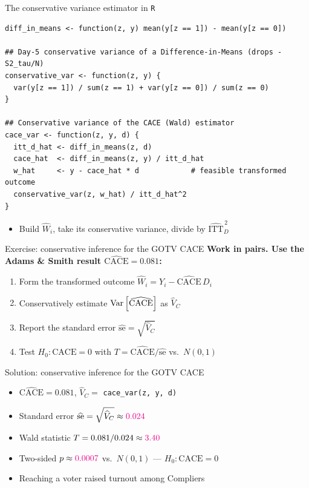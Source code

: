 \documentclass[table, xcolor = {dvipsnames}, 9pt]{beamer}
\theoremstyle{plain}
\newcommand{\mh}[1]{{\color{magenta}{#1}}}
\DeclareMathOperator{\Var}{\rm{Var}}
\newcommand{\CACE}{\mathrm{CACE}}
\newcommand{\hITTD}{\widehat{\mathrm{ITT}}_D}
\begin{document}
\begin{frame}[fragile]{The conservative variance estimator in \texttt{R}}
\begin{lstlisting}[style=Rstyle, basicstyle=\ttfamily\scriptsize, frame=single]
diff_in_means <- function(z, y) mean(y[z == 1]) - mean(y[z == 0])

## Day-5 conservative variance of a Difference-in-Means (drops -S2_tau/N)
conservative_var <- function(z, y) {
  var(y[z == 1]) / sum(z == 1) + var(y[z == 0]) / sum(z == 0)
}

## Conservative variance of the CACE (Wald) estimator
cace_var <- function(z, y, d) {
  itt_d_hat <- diff_in_means(z, d)
  cace_hat  <- diff_in_means(z, y) / itt_d_hat
  w_hat     <- y - cace_hat * d            # feasible transformed outcome
  conservative_var(z, w_hat) / itt_d_hat^2
}
\end{lstlisting}
\vfill
\begin{itemize} \vfill
\item Build $\widehat{W}_i$, take its conservative variance, divide by $\hITTD^{\,2}$ \vfill
\end{itemize}
\end{frame}
\begin{frame}[t]{Exercise: conservative inference for the GOTV CACE}
\vfill
\textbf{Work in pairs. Use the Adams \& Smith result $\widehat{\CACE} = 0.081$:}
\vfill
\begin{enumerate} \vfill
\item Form the transformed outcome $\widehat{W}_i = Y_i - \widehat{\CACE}\, D_i$ \vfill
\item Conservatively estimate $\Var\left[\widehat{\CACE}\right]$ as $\widehat{V}_C$ \vfill
\item Report the standard error $\widehat{\text{se}} = \sqrt{\widehat{V}_C}$ \vfill
\item Test $H_0: \CACE = 0$ with $T = \widehat{\CACE} / \widehat{\text{se}}$ vs.\ $N(0, 1)$ \vfill
\end{enumerate}
\vfill
\end{frame}
\begin{frame}[t]{Solution: conservative inference for the GOTV CACE}
\vfill
\begin{itemize} \vfill
\item $\widehat{\CACE} = 0.081$, \quad $\widehat{V}_C = $ \texttt{cace\_var(z, y, d)} \vfill
\item Standard error $\widehat{\text{se}} = \sqrt{\widehat{V}_C} \approx \mh{0.024}$ \vfill
\item Wald statistic $T = 0.081 / 0.024 \approx \mh{3.40}$ \vfill
\item Two-sided $p \approx \mh{0.0007}$ vs.\ $N(0, 1)$ --- \mh{reject} $H_0: \CACE = 0$ \vfill
\item Reaching a voter raised turnout among Compliers \vfill
\end{itemize} \vfill
\end{frame}
\end{document}
